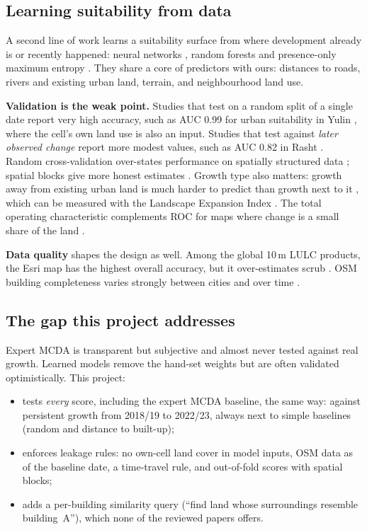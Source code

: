 \subsection{Learning suitability from data}

A second line of work learns a suitability surface from where development already is or recently
happened: neural networks \citep{pijanowski2002, liu2017flus}, random forests
\citep{ahmadlou2016, li2024} and presence-only maximum entropy \citep{wang2021}. They share a
core of predictors with ours: distances to roads, rivers and existing urban land, terrain, and
neighbourhood land use.

\textbf{Validation is the weak point.} Studies that test on a random split of a single date
report very high accuracy, such as AUC 0.99 for urban suitability in Yulin \citep{li2024}, where
the cell's own land use is also an input. Studies that test against \emph{later observed change}
report more modest values, such as AUC 0.82 in Rasht \citep{ahmadlou2016}. Random
cross-validation over-states performance on spatially structured data
\citep{roberts2017, ploton2020}; spatial blocks give more honest estimates \citep{valavi2019}.
Growth type also matters: growth away from existing urban land is much harder to predict than
growth next to it \citep{wang2021}, which can be measured with the Landscape Expansion Index
\citep{liu2010lei}. The total operating characteristic complements ROC for maps where change is
a small share of the land \citep{pontius2014}.

\textbf{Data quality} shapes the design as well. Among the global 10\,m LULC products, the Esri
map has the highest overall accuracy, but it over-estimates scrub \citep{venter2022}. OSM
building completeness varies strongly between cities and over time \citep{herfort2023}.

\subsection{The gap this project addresses}

Expert MCDA is transparent but subjective and almost never tested against real growth. Learned
models remove the hand-set weights but are often validated optimistically. This project:
\begin{itemize}
  \item tests \emph{every} score, including the expert MCDA baseline, the same way: against
        persistent growth from 2018/19 to 2022/23, always next to simple baselines (random and
        distance to built-up);
  \item enforces leakage rules: no own-cell land cover in model inputs, OSM data as of the
        baseline date, a time-travel rule, and out-of-fold scores with spatial blocks;
  \item adds a per-building similarity query (``find land whose surroundings resemble
        building~A''), which none of the reviewed papers offers.
\end{itemize}

